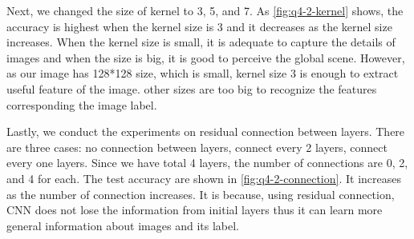 Next, we changed the size of kernel to 3, 5, and 7. As \cref{fig:q4-2-kernel} shows, the accuracy is highest when the kernel size is 3 and it decreases as the kernel size increases. When the kernel size is small, it is adequate to capture the details of images and when the size is big, it is good to perceive the global scene. However, as our image has 128*128 size, which is small, kernel size 3 is enough to extract useful feature of the image. other sizes are too big to recognize the features corresponding the image label.

Lastly, we conduct the experiments on residual connection between layers. There are three cases: no connection between layers, connect every 2 layers, connect every one layers. Since we have total 4 layers, the number of connections are 0, 2, and 4 for each. The test accuracy are shown in \cref{fig:q4-2-connection}. It increases as the number of connection increases. It is because,  using residual connection, CNN does not lose the information from initial layers thus it can learn more general information about images and its label.

